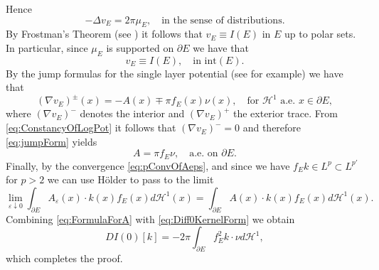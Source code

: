 \documentclass[11pt]{article}
\theoremstyle{plain}
\numberwithin{equation}{section}
\theoremstyle{definition}
\let\oldendproof\endproof
\renewenvironment{proof}[1][\proofname]{%
\oldproof[\upshape \bfseries #1]%
}{\oldendproof}
\newcommand{\eps}{\varepsilon}
\def \p{\partial}
\def \mc{\mathcal}
\begin{document}
\begin{proof}
\[        \]
        Hence
        \[
        -\Delta v_E = 2\pi \mu_E,\quad \text{in the sense of distributions.}
        \]
        By Frostman's Theorem (see \cite[Theorem 3.3.4]{ransford1995potential}) it follows that $v_E\equiv I(E)$ in $E$ up to polar sets. In particular, since $\mu_E$ is supported on $\p E$ we have that 
        \begin{equation}
            \label{eq:ConstancyOfLogPot}
            v_E\equiv I(E),\quad \text{in }\mathrm{int}(E).
        \end{equation}
        By the jump formulas for the single layer potential (see \cite[Theorem 1.1]{tolsa2020jump} for example) we have that
        \begin{equation}
            \label{eq:jumpForm}
            (\nabla v_E)^{\pm}(x)=-A(x) \mp\pi f_E(x)\nu(x),\quad \text{for $\mc H^1$ a.e. }x\in \p E,
        \end{equation}
        where $(\nabla v_E)^-$ denotes the interior and $(\nabla v_E)^+$ the exterior trace. From \eqref{eq:ConstancyOfLogPot} it follows that $(\nabla v_E)^-=0$ and therefore \eqref{eq:jumpForm} yields
        \begin{equation}
            \label{eq:FormulaForA}
            A=\pi f_E\nu,\quad \text{a.e. on }\p E.
        \end{equation}
        Finally, by the convergence \eqref{eq:pConvOfAeps}, and since we have $f_E k \in L^p \subset L^{p'}$ for $p>2$ we can use Hölder to pass to the limit
        \begin{equation*}
            \lim_{\eps\downarrow 0}\int_{\p E}A_\eps(x)\cdot k(x) f_E(x)d\mc H^1(x)=\int_{\p E}A(x)\cdot k(x)f_E(x)d\mc H^1(x).
        \end{equation*}
        Combining \eqref{eq:FormulaForA} with \eqref{eq:Diff0KernelForm} we obtain
        \[
        DI(0)[k]=-2\pi \int_{\p E}f_E^2 k \cdot \nu d\mc H^1,
        \]
        which completes the proof.
    \end{proof}
\end{document}
